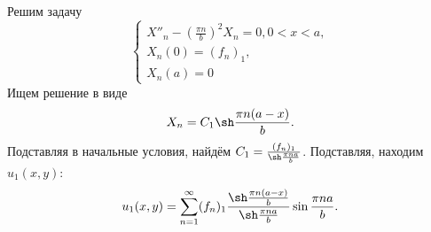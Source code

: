 \documentclass[11pt]{article}
\begin{document}
Решим задачу
\begin{equation}
\begin{cases}
X''_n - \left(\frac{\pi n}b\right)^2X_n = 0, 0 < x < a, \\
X_n(0) = (f_n)_1, \\
X_n(a) = 0
\end{cases}
\end{equation}
Ищем решение в виде
\begin{equation}
X_n = C_1\sh\frac{\pi n(a - x)}b.
\end{equation}
Подставляя в начальные условия, найдём $C_1 = \frac{(f_n)_1}{\sh\frac{\pi n a}b}$. Подставляя,
находим $u_1(x, y)$:
\begin{equation}
u_1(x, y) = \sum_{n = 1}^{\infty}(f_n)_1\frac{\sh\frac{\pi n(a - x)}b}{\sh\frac{\pi na}b}\sin\frac{\pi na}b.
\end{equation}
\end{document}
